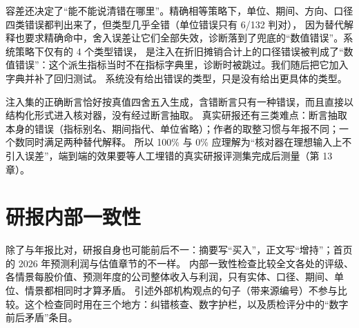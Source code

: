 容差还决定了“能不能说清错在哪里”。精确相等策略下，单位、期间、方向、口径四类错误都判出来了，但类型几乎全错（单位错误只有 6/132 判对），
因为替代解释也要求精确命中，舍入误差让它们全部失效，诊断落到了兜底的“数值错误”。系统策略下仅有的 4 个类型错误，
是注入在折旧摊销合计上的口径错误被判成了“数值错误”：这个派生指标当时不在指标字典里，诊断时被跳过。我们随后把它加入字典并补了回归测试。
系统没有给出错误的类型，只是没有给出更具体的类型。

\begin{note}[这个实验高估了真实效果]
注入集的正确断言恰好按真值四舍五入生成，含错断言只有一种错误，而且直接以结构化形式进入核对器，没有经过断言抽取。
真实研报还有三类难点：断言抽取本身的错误（指标别名、期间指代、单位省略）；作者的取整习惯与年报不同；一个数同时满足两种替代解释。
所以 100\% 与 0\% 应理解为“核对器在理想输入上不引入误差”，端到端的效果要等人工埋错的真实研报评测集完成后测量（第 13 章）。
\end{note}

\section{研报内部一致性}

除了与年报比对，研报自身也可能前后不一：摘要写“买入”，正文写“增持”；首页的 2026 年预测利润与估值章节的不一样。
内部一致性检查比较全文各处的评级、各情景每股价值、预测年度的公司整体收入与利润，只有实体、口径、期间、单位、情景都相同时才算矛盾。
引述外部机构观点的句子（带来源编号）不参与比较。这个检查同时用在三个地方：纠错核查、数字护栏，以及质检评分中的“数字前后矛盾”条目。
